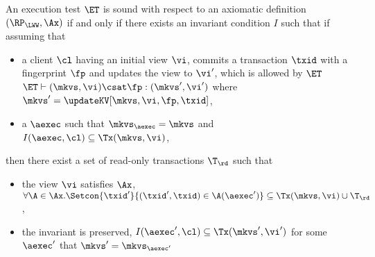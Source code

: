 \begin{definition}
\label{def:et_sound}
An execution test $\ET$ is sound with respect to an axiomatic 
definition $(\RP_{\LWW}, \Ax)$ if and only if
there exists an invariant condition $I$ such that 
if assuming that
\begin{itemize}
    \item a client \( \cl \) having an initial view \( \vi \), 
        commits a transaction \( \txid \) with a fingerprint \( \fp \) and updates the view to \( \vi' \), 
        which is allowed by \( \ET \) \ie $\ET \vdash (\mkvs, \vi) \csat \fp: (\mkvs',\vi')$ where \( \mkvs' = \updateKV[\mkvs, \vi ,\fp, \txid]\),
    \item a $\aexec$ such that $\mkvs_{\aexec} = \mkvs$ and $I(\aexec, \cl) \subseteq \Tx(\mkvs, \vi)$,
\end{itemize}
then there exist a set of read-only transactions $\T_{\rd}$ such that 
\begin{itemize}
\item the view \( \vi \) satisfies \( \Ax \), \ie $\forall \A \in \Ax. \Setcon{\txid' }{ (\txid', \txid) \in \A(\aexec')} \subseteq \Tx(\mkvs, \vi) \cup \T_{\rd}$, 
\item the invariant is preserved, \ie $I(\aexec', \cl) \subseteq \Tx(\mkvs', \vi')$ for some \( \aexec' \) that \( \mkvs' = \mkvs_{\aexec'}\)
\end{itemize}
\end{definition}

